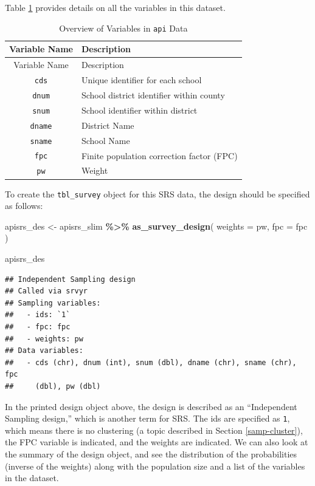 \documentclass[
]{krantz}
\makeatletter
\newenvironment{Shaded}{\begin{snugshade}}{\end{snugshade}}
\newcommand{\AttributeTok}[1]{\textcolor[rgb]{0.27,0.27,0.27}{#1}}
\newcommand{\FunctionTok}[1]{\textcolor[rgb]{0.27,0.27,0.27}{\textbf{#1}}}
\newcommand{\NormalTok}[1]{#1}
\newcommand{\OtherTok}[1]{\textcolor[rgb]{0.37,0.37,0.37}{#1}}
\newcommand{\SpecialCharTok}[1]{\textcolor[rgb]{0.43,0.43,0.43}{\textbf{#1}}}
\newenvironment{kframe}{%
\medskip{}
\setlength{\fboxsep}{.8em}
 \def\at@end@of@kframe{}%
 \ifinner\ifhmode%
  \def\at@end@of@kframe{\end{minipage}}%
  \begin{minipage}{\columnwidth}%
 \fi\fi%
 \def\FrameCommand##1{\hskip\@totalleftmargin \hskip-\fboxsep
 \colorbox{shadecolor}{##1}\hskip-\fboxsep
     \hskip-\linewidth \hskip-\@totalleftmargin \hskip\columnwidth}%
 \MakeFramed {\advance\hsize-\width
   \@totalleftmargin\z@ \linewidth\hsize
   \@setminipage}}%
 {\par\unskip\endMakeFramed%
 \at@end@of@kframe}
\renewenvironment{Shaded}{\begin{kframe}}{\end{kframe}}
\makeatother
\begin{document}
Table \ref{tab:apidata} provides details on all the variables in this dataset.

\begin{longtable}[]{@{}cl@{}}
\caption{\label{tab:apidata} Overview of Variables in \texttt{api} Data}\tabularnewline
\toprule\noalign{}
Variable Name & Description \\
\midrule\noalign{}
\endfirsthead
\toprule\noalign{}
Variable Name & Description \\
\midrule\noalign{}
\endhead
\bottomrule\noalign{}
\endlastfoot
\texttt{cds} & Unique identifier for each school \\
\texttt{dnum} & School district identifier within county \\
\texttt{snum} & School identifier within district \\
\texttt{dname} & District Name \\
\texttt{sname} & School Name \\
\texttt{fpc} & Finite population correction factor (FPC) \\
\texttt{pw} & Weight \\
\end{longtable}

To create the \texttt{tbl\_survey} object for this SRS data, the design should be specified as follows:

\begin{Shaded}
\begin{Highlighting}[]
\NormalTok{apisrs\_des }\OtherTok{\textless{}{-}}\NormalTok{ apisrs\_slim }\SpecialCharTok{\%\textgreater{}\%}
  \FunctionTok{as\_survey\_design}\NormalTok{(}
    \AttributeTok{weights =}\NormalTok{ pw,}
    \AttributeTok{fpc =}\NormalTok{ fpc}
\NormalTok{  )}

\NormalTok{apisrs\_des}
\end{Highlighting}
\end{Shaded}

\begin{verbatim}
## Independent Sampling design
## Called via srvyr
## Sampling variables:
##   - ids: `1` 
##   - fpc: fpc 
##   - weights: pw 
## Data variables: 
##   - cds (chr), dnum (int), snum (dbl), dname (chr), sname (chr), fpc
##     (dbl), pw (dbl)
\end{verbatim}

In the printed design object above, the design is described as an ``Independent Sampling design,'' which is another term for SRS. The ids are specified as \texttt{1}, which means there is no clustering (a topic described in Section \ref{samp-cluster}), the FPC variable is indicated, and the weights are indicated. We can also look at the summary of the design object, and see the distribution of the probabilities (inverse of the weights) along with the population size and a list of the variables in the dataset.
\end{document}
